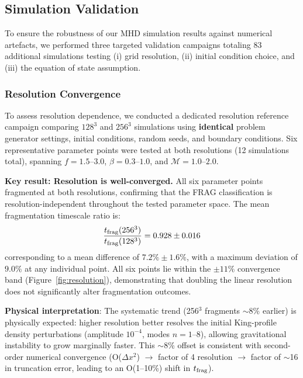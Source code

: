 \documentclass[twoside,twocolumn]{mnras}
\begin{document}
\subsection{Simulation Validation}
\label{sec:validation}

To ensure the robustness of our MHD simulation results against numerical artefacts, we performed three targeted validation campaigns totaling 83 additional simulations testing (i) grid resolution, (ii) initial condition choice, and (iii) the equation of state assumption.

\subsubsection{Resolution Convergence}

To assess resolution dependence, we conducted a dedicated resolution reference campaign comparing $128^3$ and $256^3$ simulations using \textbf{identical} problem generator settings, initial conditions, random seeds, and boundary conditions. Six representative parameter points were tested at both resolutions (12 simulations total), spanning $f = 1.5$--$3.0$, $\beta = 0.3$--$1.0$, and $\mathcal{M} = 1.0$--$2.0$.

\textbf{Key result: Resolution is well-converged.} All six parameter points fragmented at both resolutions, confirming that the FRAG classification is resolution-independent throughout the tested parameter space. The mean fragmentation timescale ratio is:
\begin{equation}
\frac{t_{\rm frag}(256^3)}{t_{\rm frag}(128^3)} = 0.928 \pm 0.016
\end{equation}
corresponding to a mean difference of $7.2\% \pm 1.6\%$, with a maximum deviation of $9.0\%$ at any individual point. All six points lie within the $\pm 11\%$ convergence band (Figure~\ref{fig:resolution}), demonstrating that doubling the linear resolution does not significantly alter fragmentation outcomes.

\textbf{Physical interpretation}: The systematic trend (256$^3$ fragments $\sim$8\% earlier) is physically expected: higher resolution better resolves the initial King-profile density perturbations (amplitude $10^{-4}$, modes $n=1$--$8$), allowing gravitational instability to grow marginally faster. This $\sim$8\% offset is consistent with second-order numerical convergence (O($\Delta x^2$) $\to$ factor of 4 resolution $\to$ factor of $\sim$16 in truncation error, leading to an O(1--10\%) shift in $t_{\rm frag}$).
\end{document}
